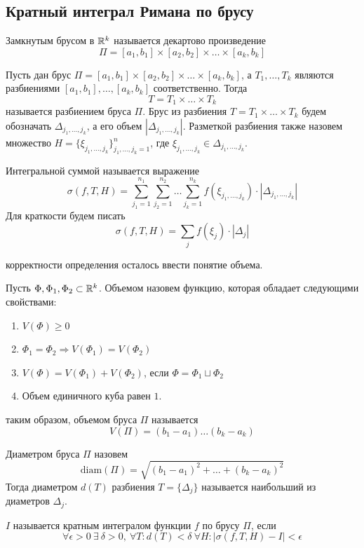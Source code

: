 \subsection{Кратный интеграл Римана по брусу}
\begin{definition}
    Замкнутым брусом в $\mathbb{R}^k$ называется декартово произведение
    \[\Pi=[a_1,b_1]\times [a_2,b_2]\times \dots\times [a_k, b_k]\]
\end{definition}
\begin{definition}
    Пусть дан брус 
    $\Pi=[a_1,b_1]\times [a_2,b_2]\times \dots\times [a_k, b_k]$, а $T_1,\dots,T_k$ являются разбиениями $[a_1,b_1], \dots, [a_k,b_k]$ соответственно. Тогда 
    \[T=T_1\times\dots\times T_k\] 
    называется разбиением бруса $\Pi$. Брус из разбиения $T=T_1\times \dots\times T_k$ будем обозначать $\Delta_{j_1,\dots,j_k}$, а его объем $|\Delta_{j_1,\dots,j_k}|$. Разметкой разбиения также назовем множество $H=\{\xi_{j_1,\dots,j_k}\}_{j_1,\dots,j_k=1}^n$, где $\xi_{j_1,\dots,j_k}\in \Delta_{j_1,\dots,j_k}$.
\end{definition}
\begin{definition}
    Интегральной суммой называется выражение
    \[\sigma(f, T, H)=\sum\limits_{j_1=1}^{n_1}\sum\limits_{j_2=1}^{n_2}\dots \sum\limits_{j_k=1}^{n_k}f(\xi_{j_1,\dots,j_k})\cdot |\Delta_{j_1,\dots,j_k}|\]
    Для краткости будем писать
    \[\sigma(f, T, H)=\sum\limits_{j} f(\xi_j)\cdot |\Delta_j|\]
\end{definition}
 корректности определения осталось ввести понятие объема.
\begin{definition}
    Пусть $\Phi, \Phi_1, \Phi_2\subset \mathbb{R}^k$. Объемом назовем функцию, которая обладает следующими свойствами:
\begin{enumerate}
    \item $V(\Phi)\geq 0$
    \item $\Phi_1=\Phi_2 \Rightarrow V(\Phi_1)=V(\Phi_2)$
    \item $V(\Phi)=V(\Phi_1)+V(\Phi_2)$, если $\Phi=\Phi_1\sqcup\Phi_2$
    \item Объем единичного куба равен $1$.
\end{enumerate}
таким образом, объемом бруса $\Pi$ называется
\[V(\Pi)=(b_1-a_1)\dots(b_k-a_k)\]
\end{definition}
\begin{definition}
    Диаметром бруса $\Pi$ назовем
    \[\text{diam}(\Pi)=\sqrt{(b_1-a_1)^2+\dots+(b_k-a_k)^2}\]
Тогда диаметром $d(T)$ разбиения $T=\{\Delta_j\}$ называется наибольший из диаметров $\Delta_j$.
\end{definition}
\begin{definition}
    $I$ называется кратным интегралом функции $f$ по брусу $\Pi$, если
    \[\forall \epsilon>0\ \exists\ \delta>0,\ \forall T: d(T)<\delta\ \forall H: |\sigma(f,T,H)-I|<\epsilon\]
\end{definition}
